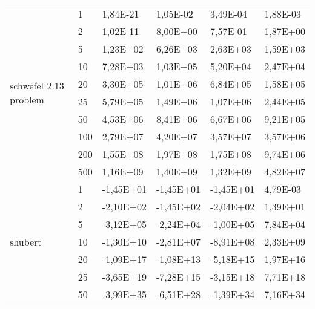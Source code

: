 \begin{longtable}[c]{|p{3.5cm}|l|l|l|l|l|}
\multirow[t]{10}{*}{schwefel 2.13 problem} & 1         & 1,84E-21   & 1,05E-02   & 3,49E-04   & 1,88E-03  \\ \cline{2-6} 
                                        & 2         & 1,02E-11   & 8,00E+00   & 7,57E-01   & 1,87E+00  \\ \cline{2-6} 
                                        & 5         & 1,23E+02   & 6,26E+03   & 2,63E+03   & 1,59E+03  \\ \cline{2-6} 
                                        & 10        & 7,28E+03   & 1,03E+05   & 5,20E+04   & 2,47E+04  \\ \cline{2-6} 
                                        & 20        & 3,30E+05   & 1,01E+06   & 6,84E+05   & 1,58E+05  \\ \cline{2-6} 
                                        & 25        & 5,79E+05   & 1,49E+06   & 1,07E+06   & 2,44E+05  \\ \cline{2-6} 
                                        & 50        & 4,53E+06   & 8,41E+06   & 6,67E+06   & 9,21E+05  \\ \cline{2-6} 
                                        & 100       & 2,79E+07   & 4,20E+07   & 3,57E+07   & 3,57E+06  \\ \cline{2-6} 
                                        & 200       & 1,55E+08   & 1,97E+08   & 1,75E+08   & 9,74E+06  \\ \cline{2-6} 
                                        & 500       & 1,16E+09   & 1,40E+09   & 1,32E+09   & 4,82E+07  \\ \hline
\multirow[t]{10}{*}{shubert}               & 1         & -1,45E+01  & -1,45E+01  & -1,45E+01  & 4,79E-03  \\ \cline{2-6} 
                                        & 2         & -2,10E+02  & -1,45E+02  & -2,04E+02  & 1,39E+01  \\ \cline{2-6} 
                                        & 5         & -3,12E+05  & -2,24E+04  & -1,00E+05  & 7,84E+04  \\ \cline{2-6} 
                                        & 10        & -1,30E+10  & -2,81E+07  & -8,91E+08  & 2,33E+09  \\ \cline{2-6} 
                                        & 20        & -1,09E+17  & -1,08E+13  & -5,18E+15  & 1,97E+16  \\ \cline{2-6} 
                                        & 25        & -3,65E+19  & -7,28E+15  & -3,15E+18  & 7,71E+18  \\ \cline{2-6} 
                                        & 50        & -3,99E+35  & -6,51E+28  & -1,39E+34  & 7,16E+34  \\ \cline{2-6} 

\end{longtable}
